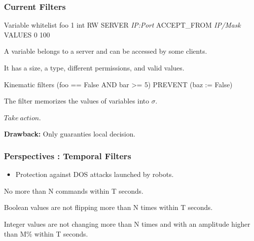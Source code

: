 \documentclass{beamer}
\begin{document}
\begin{frame}
    \frametitle{Current Filters}
    
    \begin{block}{Variable whitelist}
        {\sf foo {\color{red} 1} {\color{blue} int} {\color{green!50!black} RW} {\color{cyan} SERVER {\em IP:Port}} {\color{yellow!50!black} ACCEPT\_FROM {\em IP/Mask}} {\color{orange} VALUES 0 100}}

        \medskip
        A variable belongs to a {\color{cyan} server} and can be accessed by some {\color{yellow!50!black} clients}.

        It has a {\color{red} size}, a {\color{blue} type}, different {\color{green!50!black} permissions}, and {\color{orange} valid values}.
    \end{block}
    \vfill
    \begin{block}{Kinematic filters}
        {\sf (foo == False AND bar >= 5) PREVENT (baz := False)}

        \medskip
        The filter memorizes the values of variables into $\sigma$.

        \begin{algorithmic}
                    \State $Take~action.$
                \EndIf
            \EndIf
        \end{algorithmic}
        {\bf Drawback:} Only guaranties local decision.%
    \end{block}
\end{frame}

\begin{frame}
    \frametitle{Perspectives : Temporal Filters}%

    \begin{itemize}
        \item Protection against DOS attacks launched by robots.
    \end{itemize}
    \vfill
    \begin{example}
        No more than {\color{blue} N commands} {\color{red} within T seconds}.
    \end{example}
    \vfill
    \begin{example}
        Boolean values are not flipping {\color{blue} more than N times} {\color{red} within T seconds}.
    \end{example}
    \vfill
    \begin{example}
        Integer values are not changing {\color{blue} more than N times} and with an {\color{orange} amplitude higher than M\%} {\color{red} within T seconds}.
    \end{example}
\end{frame}
\end{document}
